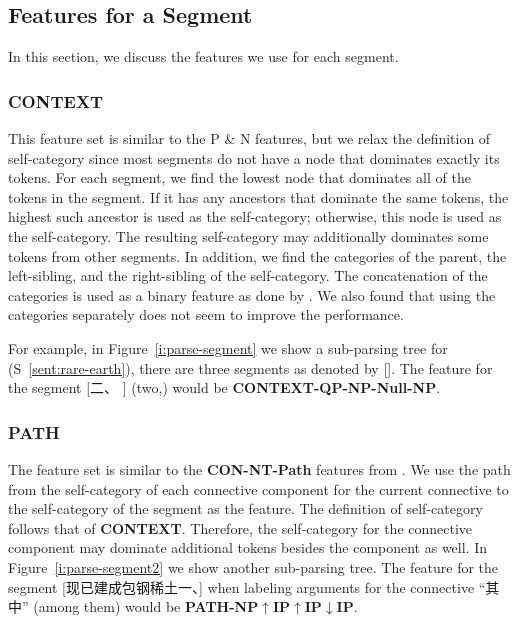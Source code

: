 \subsection{Features for a Segment}

In this section, we discuss the features we use for each segment.

\subsubsection{CONTEXT}

This feature set is similar to the P \& N features, but we relax the
definition of self-category since most segments do not have a node that
dominates exactly its tokens. For each segment, we find the lowest node
that dominates all of the tokens in the segment. If it has any ancestors
that dominate the same tokens, the highest such ancestor is used as
the self-category; otherwise, this node is used as the self-category.
The resulting self-category may additionally dominates
some tokens from other segments.
In addition, we find the categories of the parent, the left-sibling, and
the right-sibling of the self-category. The concatenation of the categories is
used as a binary feature as done by \cite{kong2014a}. We also found that
using the categories separately does not seem to improve the performance.

For example, in Figure~\ref{i:parse-segment} we show a sub-parsing tree for
(S~\ref{sent:rare-earth}), there are three segments as denoted by [].
The feature for the segment [二、 ] (two,) would be
\textbf{CONTEXT-QP-NP-Null-NP}.



\subsubsection{PATH}

The feature set is similar to the \textbf{CON-NT-Path} features
from \cite{kong2014a}.
We use the path from the self-category of each connective component for the
current connective to the self-category of the segment as the feature. The
definition of self-category follows that of \textbf{CONTEXT}. Therefore,
the self-category for the connective component may dominate additional tokens
besides the component as well.
In Figure~\ref{i:parse-segment2} we show another sub-parsing tree.
The feature for the segment [现已建成包钢稀土一、] when labeling arguments
for the connective ``其中'' (among them) would be
\textbf{PATH-NP$\uparrow$IP$\uparrow$IP$\downarrow$IP}.

